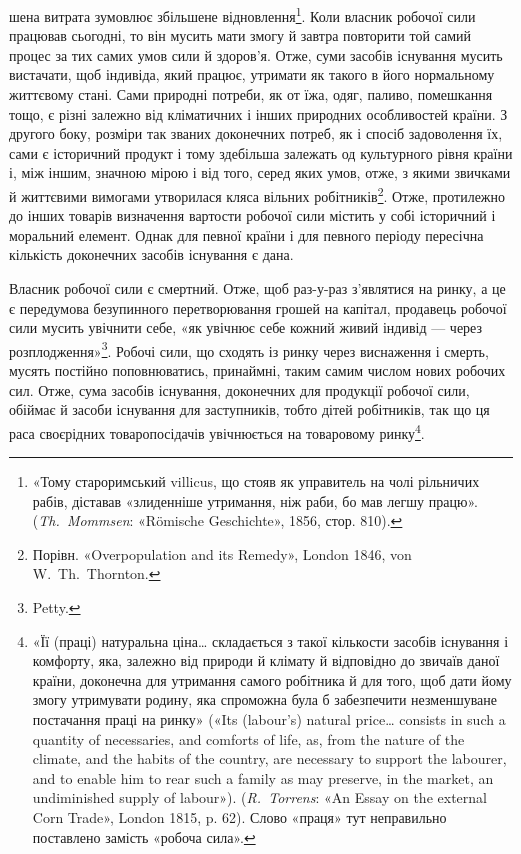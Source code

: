 \parcont{}  %
шена витрата зумовлює збільшене відновлення\footnote{
«Тому староримський villicus, що стояв як управитель на чолі
рільничих рабів, діставав «злиденніше утримання, ніж раби, бо мав
легшу працю». (\emph{Th.~Mommsen}: «Römische Geschichte», 1856, стор. 810).
}. Коли власник
робочої сили працював сьогодні, то він мусить мати змогу й завтра
повторити той самий процес за тих самих умов сили й здоров’я.
Отже, суми засобів існування мусить вистачати, щоб індивіда,
який працює, утримати як такого в його нормальному життєвому
стані. Сами природні потреби, як от їжа, одяг, паливо, помешкання
тощо, є різні залежно від кліматичних і інших природних
особливостей країни. З другого боку, розміри так званих доконечних
потреб, як і спосіб задоволення їх, сами є історичний
продукт і тому здебільша залежать од культурного рівня країни
і, між іншим, значною мірою і від того, серед яких умов, отже,
з якими звичками й життєвими вимогами утворилася кляса вільних
робітників\footnote{
Порівн. «Overpopulation and its Remedy», London 1846, von W.~Th.~Thornton.
}. Отже, протилежно до інших товарів визначення
вартости робочої сили містить у собі історичний і моральний
елемент. Однак для певної країни і для певного періоду пересічна
кількість доконечних засобів існування є дана.

Власник робочої сили є смертний. Отже, щоб раз-у-раз
з’являтися на ринку, а це є передумова безупинного перетворювання
грошей на капітал, продавець робочої сили мусить увічнити
себе, «як увічнює себе кожний живий індивід — через
розплодження»\footnote{
Petty.
}. Робочі сили, що сходять із ринку через виснаження
і смерть, мусять постійно поповнюватись, принаймні,
таким самим числом нових робочих сил. Отже, сума засобів
існування, доконечних для продукції робочої сили, обіймає й
засоби існування для заступників, тобто дітей робітників, так
що ця раса своєрідних товаропосідачів увічнюється на товаровому
ринку\footnote{
«Її (праці) натуральна ціна\dots{} складається з такої кількости засобів
існування і комфорту, яка, залежно від природи й клімату й відповідно
до звичаїв даної країни, доконечна для утримання самого робітника
й для того, щоб дати йому змогу утримувати родину, яка спроможна
була б забезпечити незменшуване постачання праці на ринку» («Its
(labour’s) natural price\dots{} consists in such a quantity of necessaries, and
comforts of life, as, from the nature of the climate, and the habits of the
country, are necessary to support the labourer, and to enable him to rear
such a family as may preserve, in the market, an undiminished supply of
labour»). (\emph{R.~Torrens}: «An Essay on the external Corn Trade», London
1815, p. 62). Слово «праця» тут неправильно поставлено замість «робоча
сила».
}.

